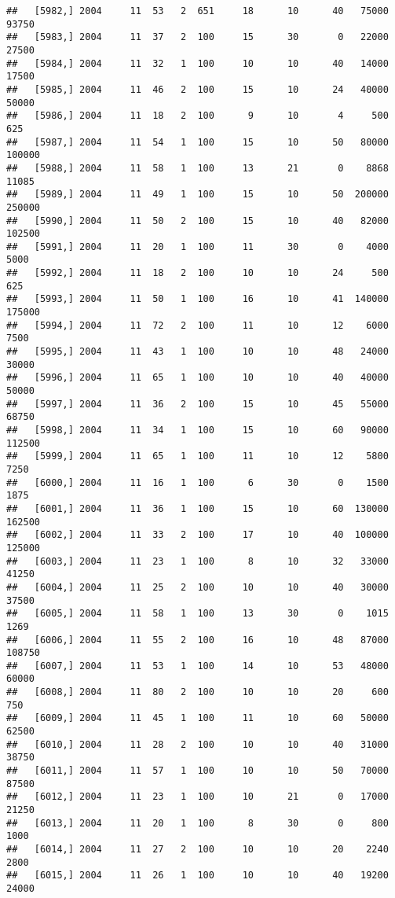 \documentclass{article}\usepackage[]{graphicx}\usepackage[]{color}
\makeatletter
\newenvironment{kframe}{%
 \def\at@end@of@kframe{}%
 \ifinner\ifhmode%
  \def\at@end@of@kframe{\end{minipage}}%
  \begin{minipage}{\columnwidth}%
 \fi\fi%
 \def\FrameCommand##1{\hskip\@totalleftmargin \hskip-\fboxsep
 \colorbox{shadecolor}{##1}\hskip-\fboxsep
     \hskip-\linewidth \hskip-\@totalleftmargin \hskip\columnwidth}%
 \MakeFramed {\advance\hsize-\width
   \@totalleftmargin\z@ \linewidth\hsize
   \@setminipage}}%
 {\par\unskip\endMakeFramed%
 \at@end@of@kframe}
\newenvironment{knitrout}{}{} %
\makeatother
\begin{document}
\begin{knitrout}
\begin{kframe}
\begin{verbatim}
##   [5982,] 2004     11  53   2  651     18      10      40   75000   93750
##   [5983,] 2004     11  37   2  100     15      30       0   22000   27500
##   [5984,] 2004     11  32   1  100     10      10      40   14000   17500
##   [5985,] 2004     11  46   2  100     15      10      24   40000   50000
##   [5986,] 2004     11  18   2  100      9      10       4     500     625
##   [5987,] 2004     11  54   1  100     15      10      50   80000  100000
##   [5988,] 2004     11  58   1  100     13      21       0    8868   11085
##   [5989,] 2004     11  49   1  100     15      10      50  200000  250000
##   [5990,] 2004     11  50   2  100     15      10      40   82000  102500
##   [5991,] 2004     11  20   1  100     11      30       0    4000    5000
##   [5992,] 2004     11  18   2  100     10      10      24     500     625
##   [5993,] 2004     11  50   1  100     16      10      41  140000  175000
##   [5994,] 2004     11  72   2  100     11      10      12    6000    7500
##   [5995,] 2004     11  43   1  100     10      10      48   24000   30000
##   [5996,] 2004     11  65   1  100     10      10      40   40000   50000
##   [5997,] 2004     11  36   2  100     15      10      45   55000   68750
##   [5998,] 2004     11  34   1  100     15      10      60   90000  112500
##   [5999,] 2004     11  65   1  100     11      10      12    5800    7250
##   [6000,] 2004     11  16   1  100      6      30       0    1500    1875
##   [6001,] 2004     11  36   1  100     15      10      60  130000  162500
##   [6002,] 2004     11  33   2  100     17      10      40  100000  125000
##   [6003,] 2004     11  23   1  100      8      10      32   33000   41250
##   [6004,] 2004     11  25   2  100     10      10      40   30000   37500
##   [6005,] 2004     11  58   1  100     13      30       0    1015    1269
##   [6006,] 2004     11  55   2  100     16      10      48   87000  108750
##   [6007,] 2004     11  53   1  100     14      10      53   48000   60000
##   [6008,] 2004     11  80   2  100     10      10      20     600     750
##   [6009,] 2004     11  45   1  100     11      10      60   50000   62500
##   [6010,] 2004     11  28   2  100     10      10      40   31000   38750
##   [6011,] 2004     11  57   1  100     10      10      50   70000   87500
##   [6012,] 2004     11  23   1  100     10      21       0   17000   21250
##   [6013,] 2004     11  20   1  100      8      30       0     800    1000
##   [6014,] 2004     11  27   2  100     10      10      20    2240    2800
##   [6015,] 2004     11  26   1  100     10      10      40   19200   24000

\end{verbatim}
\end{kframe}
\end{knitrout}
\end{document}
